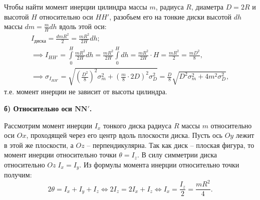 \documentclass[a4paper, 12pt]{article}
\begin{document}
        Чтобы найти момент инерции цилиндра массы $m$, радиуса $R$, диаметра $D = 2R$ и высотой $H$ относительно оси $HH'$, разобьем его на тонкие диски высотой $dh$ массы $dm = \frac{m}{H}dh$ вдоль этой оси:
        \vspace{-6mm}
        \begin{equation*}
            \begin{aligned}
                I_{диска} = \frac{dmR^2}{2} = \frac{mR^2}{2H}dh; \\
                \implies I_{HH'} = \int\limits_0^H \frac{mR^2}{2H}dh = \frac{mR^2}{2H}\int\limits_0^Hdh = \frac{mR^2}{2H} \cdot H = \frac{mR^2}{2} = \frac{mD^2}{8}, \\
                \implies \sigma_{I_{HH'}} = \sqrt{\left(\frac{D^2}{8}\right)^2\sigma_m^2 + \left(\frac{m}{8}\cdot2D\right)^2\sigma_D^2} = \frac{D}{8}\sqrt{D^2\sigma_m^2+4m^2\sigma_D^2},
            \end{aligned}
        \end{equation*}
        т.е. момент инерции не зависит от высоты цилиндра.

        \textbf{б) Относительно оси $\boldsymbol{NN'}$.}

        Рассмотрим момент инерции $I_{x}$ тонкого диска радиуса $R$ массы $m$ относительно оси $Ox$, проходящей через его центр вдоль плоскости диска. Пусть ось $Oy$ лежит в этой же плоскости, а $Oz$ -- перпендикулярна. Так как диск -- плоская фигура, то момент инерции относительно точки $\theta = I_z$. В силу симметрии диска относительно $Oz\;I_x = I_y$. Из формулы момента инерции относительно точки получим:
        \begin{equation*}
            2\theta = I_x + I_y + I_z \iff 2I_z = 2I_x + I_z \iff I_x = \frac{I_z}{2} = \frac{mR^2}{4}.
        \end{equation*}
\end{document}
